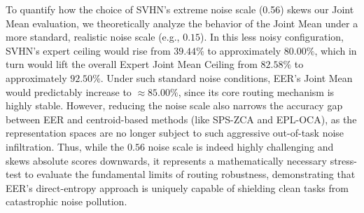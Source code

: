To quantify how the choice of SVHN's extreme noise scale (0.56) skews our Joint Mean evaluation, we theoretically analyze the behavior of the Joint Mean under a more standard, realistic noise scale (e.g., $0.15$). In this less noisy configuration, SVHN's expert ceiling would rise from $39.44\%$ to approximately $80.00\%$, which in turn would lift the overall Expert Joint Mean Ceiling from $82.58\%$ to approximately $92.50\%$. Under such standard noise conditions, EER's Joint Mean would predictably increase to $\approx 85.00\%$, since its core routing mechanism is highly stable. However, reducing the noise scale also narrows the accuracy gap between EER and centroid-based methods (like SPS-ZCA and EPL-OCA), as the representation spaces are no longer subject to such aggressive out-of-task noise infiltration. Thus, while the $0.56$ noise scale is indeed highly challenging and skews absolute scores downwards, it represents a mathematically necessary stress-test to evaluate the fundamental limits of routing robustness, demonstrating that EER's direct-entropy approach is uniquely capable of shielding clean tasks from catastrophic noise pollution.

